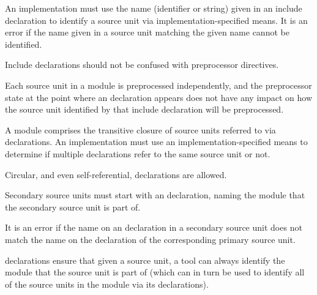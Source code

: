 \begin{Syntax}
          \code{;}
    \SynOr  {}  \code{;}
\end{Syntax}

An implementation must use the name (identifier or string) given in an include declaration to identify a source unit via implementation-specified means.
It is an error if the name given in a source unit matching the given name cannot be identified.

\begin{Note}
Include declarations should not be confused with preprocessor  directives.

Each source unit in a module is preprocessed independently, and the preprocessor state at the point where an  declaration appears does not have any impact on how the source unit identified by that include declaration will be preprocessed.
\end{Note}

A module comprises the transitive closure of source units referred to via  declarations.
An implementation must use an implementation-specified means to determine if multiple  declarations refer to the same source unit or not.

\begin{Note}
Circular, and even self-referential,  declarations are allowed.
\end{Note}


Secondary source units must start with an  declaration, naming the module that the secondary source unit is part of.

\begin{Syntax}
      \code{;}
\end{Syntax}

\begin{Note}
It is an error if the name on an  declaration in a secondary source unit does not match the name on the  declaration of the corresponding primary source unit.
\end{Note}

\begin{Rationale}
 declarations ensure that given a source unit, a tool can always identify the module that the source unit is part of (which can in turn be used to identify all of the source units in the module via its  declarations).
\end{Rationale}

